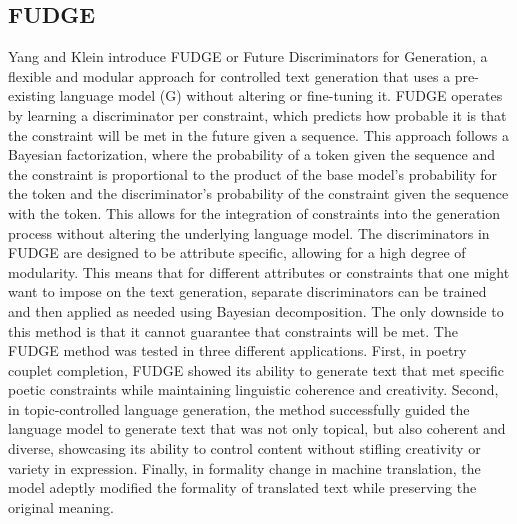 \subsection{FUDGE}
Yang and Klein \cite{yang_fudge_2021} introduce FUDGE or Future Discriminators for Generation, a flexible and modular approach for controlled text generation that uses a pre-existing language model (G) without altering or fine-tuning it. FUDGE operates by learning a discriminator per constraint, which predicts how probable it is that the constraint will be met in the future given a sequence. This approach follows a Bayesian factorization, where the probability of a token given the sequence and the constraint is proportional to the product of the base model's probability for the token and the discriminator's probability of the constraint given the sequence with the token. This allows for the integration of constraints into the generation process without altering the underlying language model. The discriminators in FUDGE are designed to be attribute specific, allowing for a high degree of modularity. This means that for different attributes or constraints that one might want to impose on the text generation, separate discriminators can be trained and then applied as needed using Bayesian decomposition. The only downside to this method is that it cannot guarantee that constraints will be met. The FUDGE method was tested in three different applications. First, in poetry couplet completion, FUDGE showed its ability to generate text that met specific poetic constraints while maintaining linguistic coherence and creativity. Second, in topic-controlled language generation, the method successfully guided the language model to generate text that was not only topical, but also coherent and diverse, showcasing its ability to control content without stifling creativity or variety in expression. Finally, in formality change in machine translation, the model adeptly modified the formality of translated text while preserving the original meaning.

